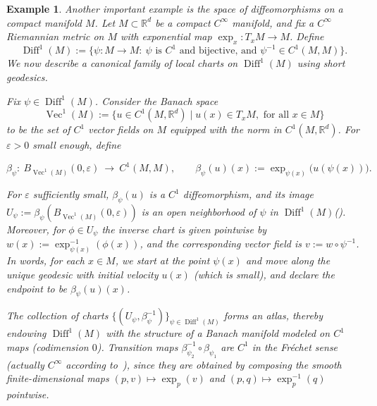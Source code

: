 \documentclass[12pt]{amsart}
\numberwithin{equation}{section}
\newtheorem{example}{Example}[section]
\theoremstyle{remark}
\begin{document}
\begin{example}
  \label{ex:diff1_banach_manifold}
Another important example is the space of diffeomorphisms on a compact manifold $M$.
Let $M\subset\mathbb R^d$ be a compact $C^\infty$ manifold, and fix a $C^\infty$ Riemannian metric on $M$ with exponential map $\exp_x:T_xM\to M$.
Define
\begin{equation}
\operatorname{Diff}^1(M)
:=\{\psi:M\to M:\ \psi \text{ is $C^1$ and bijective, and }\psi^{-1}\in C^1(M,M)\}.
\end{equation}
We now describe a canonical family of local charts on $\operatorname{Diff}^1(M)$ using short geodesics. 

Fix $\psi\in \operatorname{Diff}^1(M)$. Consider the Banach space 
\begin{equation}
  \operatorname{Vec}^1(M):= \{u\in C^1(M, \mathbb R^d)\mid u(x)\in T_xM, \text{ for all } x\in M\}
\end{equation}
to be the set of $C^1$ vector fields on $M$ equipped with the norm in $C^1(M,\mathbb R^d)$.
For $\varepsilon>0$ small enough, define

\begin{equation}\label{eq:chart-diff1-vf}
\beta_\psi:\ B_{\operatorname{Vec}^1(M)}(0,\varepsilon)\ \longrightarrow\ C^1(M,M),\qquad
\beta_\psi(u)(x):=\exp_{\psi(x)}\big(u(\psi(x))\big).
\end{equation}

For $\varepsilon$ sufficiently small, $\beta_\psi(u)$ is a $C^1$ diffeomorphism, and its image
$U_\psi:=\beta_\psi(B_{\operatorname{Vec}^1(M)}(0,\varepsilon))$ is an open neighborhood of $\psi$ in
$\operatorname{Diff}^1(M)$(\cite{wittmann2019banach}).
Moreover, for $\phi\in U_\psi$ the inverse chart is given pointwise by
$w(x):=\exp_{\psi(x)}^{-1}(\phi(x))$, and the corresponding vector field is $v:=w\circ\psi^{-1}$.
In words, for each $x\in M$, we start at the point $\psi(x)$ and move along the unique geodesic with initial velocity $u(x)$ (which is small), and declare the endpoint to be $\beta_\psi(u)(x)$.

The collection of charts $\{(U_\psi,\beta_\psi^{-1})\}_{\psi\in\operatorname{Diff}^1(M)}$ forms an atlas, thereby endowing $\operatorname{Diff}^1(M)$ with the structure of a Banach manifold modeled on $C^1$ maps (codimension $0$). Transition maps $\beta_{\psi_2}^{-1}\circ \beta_{\psi_1}$ are $C^1$ in the Fr\'echet sense (actually $C^\infty$ according to~\cite{wittmann2019banach}), since they are obtained by composing the smooth finite-dimensional maps $(p,v)\mapsto \exp_p(v)$ and $(p,q)\mapsto \exp_p^{-1}(q)$ pointwise.

\end{example}
\end{document}
